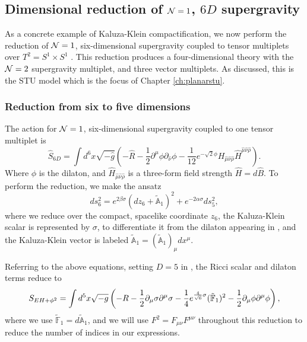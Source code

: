 \subsection[Dimensional reduction of \titleN$=1$, $6D$ supergravity]{Dimensional reduction of ${\cal N}=1$, $6D$ supergravity}
\label{sec:studimred}

As a concrete example of Kaluza-Klein compactification, we now perform the reduction of ${\cal N}=1$, six-dimensional supergravity coupled to tensor multiplets over $T^2 = S^1 \times S^1$ \cite{Smith_1985, Duff:1995sm}. This reduction produces a four-dimensional theory with the ${\cal N} = 2$ supergravity multiplet, and three vector multiplets. As discussed, this is the STU model which is the focus of Chapter \ref{ch:planarstu}.

\subsubsection{Reduction from six to five dimensions}

The action for ${\cal N}=1$, six-dimensional supergravity coupled to one tensor multiplet is \cite{Duff:1995sm}
\begin{equation}
\label{eq:6dlag}
    \hat{S}_{6D} =\int d^6x \sqrt{-\hat{g}} \left(-\hat{R} - \frac{1}{2}  \partial^{\hat{\mu}} \phi \partial_{\hat{\nu}} \phi -\frac{1}{12} e^{-\sqrt{2}\phi} H_{\hat{\mu} \hat{\nu} \hat{\rho}} \hat{H}^{\hat{\mu} \hat{\nu} \hat{\rho}}\right).
\end{equation}
Where $\phi$ is the dilaton, and $\hat{H}_{\hat{\mu} \hat{\nu} \hat{\rho}}$ is a three-form field strength $\hat{H} = d\hat{B}$. To perform the reduction, we make the ansatz
\begin{equation}
\label{eq:KKansatz6d}
  ds^2_{6} =  e^{2 \beta \sigma} (dz_6 + \tilde{\mathbb{A}}_1)^2 + e^{-2\alpha \sigma} ds_5^2,
\end{equation}
where we reduce over the compact, spacelike coordinate $z_6$, the Kaluza-Klein scalar is represented by $\sigma$, to differentiate it from the dilaton appearing in , and the Kaluza-Klein vector is labeled $\tilde{\mathbb{A}}_1 = (\tilde{\mathbb{A}}_1)_\mu dx^\mu$. 

Referring to the above equations, setting $D = 5$ in , the Ricci scalar and dilaton terms reduce to
\begin{equation*}
	S_{EH + \phi^2} = \int d^5x \sqrt{-g} \left(-R - \frac{1}{2} \partial_\mu \sigma \partial^\mu \sigma - \frac{1}{4} e^{\frac{4}{\sqrt{6}} \sigma} (\tilde{\mathbb{F}}_{1})^2 - \frac{1}{2}  \partial_\mu \phi \partial^\mu \phi  \right),
\end{equation*}
where we use $\tilde{\mathbb{F}}_1 = d\tilde{\mathbb{A}}_1$, and we will use $F^2 = F_{\mu \nu}F^{\mu \nu}$ throughout this reduction to reduce the number of indices in our expressions. 

